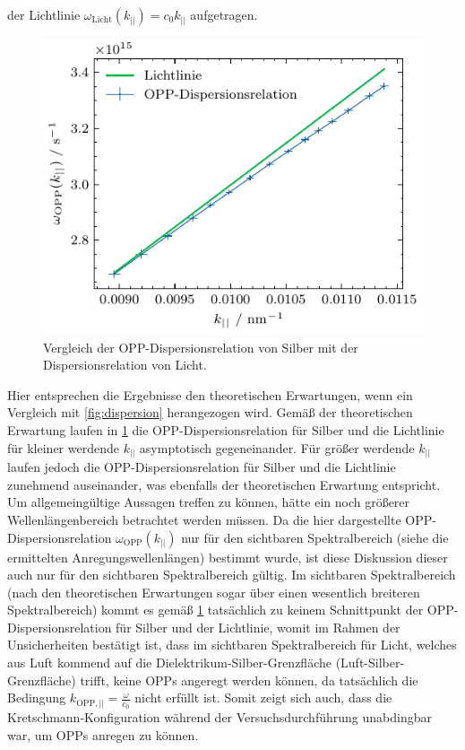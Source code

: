 der Lichtlinie $\omega_{\mathrm{Licht}}(k_{||}) = c_0 k_{||}$ aufgetragen.
\begin{figure}[H]
	\centering
	\includegraphics[width=0.6\linewidth]{../figs/dispersionsrelation_opp.pdf}
	\caption{Vergleich der OPP-Dispersionsrelation von Silber mit der Dispersionsrelation von Licht.}
	\label{fig:darstellung_dispersionsrelation}
\end{figure} Hier entsprechen die Ergebnisse den theoretischen Erwartungen, wenn ein Vergleich mit \cref{fig:dispersion} herangezogen wird. Gemäß der
theoretischen Erwartung laufen in \cref{fig:darstellung_dispersionsrelation} die OPP-Dispersionsrelation für Silber und die Lichtlinie für kleiner
werdende $k_{||}$ asymptotisch gegeneinander. Für größer werdende $k_{||}$ laufen jedoch die OPP-Dispersionsrelation für Silber und die Lichtlinie
zunehmend auseinander, was ebenfalls der theoretischen Erwartung entspricht. Um allgemeingültige Aussagen treffen zu können, hätte ein noch größerer
Wellenlängenbereich betrachtet werden müssen. Da die hier dargestellte OPP-Dispersionsrelation $\omega_{\mathrm{OPP}}(k_{||})$ nur für den
sichtbaren Spektralbereich (siehe die ermittelten Anregungswellenlängen) bestimmt wurde, ist diese Diskussion dieser auch nur für den sichtbaren Spektralbereich gültig.
Im sichtbaren Spektralbereich (nach den theoretischen Erwartungen sogar über einen wesentlich breiteren Spektralbereich) kommt es gemäß \cref{fig:darstellung_dispersionsrelation}
tatsächlich zu keinem Schnittpunkt der OPP-Dispersionsrelation für Silber und der Lichtlinie, womit im Rahmen der Unsicherheiten bestätigt ist, dass im sichtbaren Spektralbereich
für Licht, welches aus Luft kommend auf die Dielektrikum-Silber-Grenzfläche (Luft-Silber-Grenzfläche) trifft, keine OPPs angeregt werden können, da tatsächlich die
Bedingung $k_{\mathrm{OPP},||} = \frac{\omega}{c_0}$ nicht erfüllt ist. Somit zeigt sich auch, dass die Kretschmann-Konfiguration während der Versuchsdurchführung
unabdingbar war, um OPPs anregen zu können.